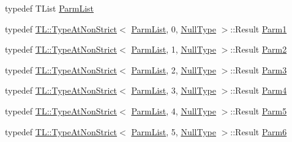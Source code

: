 \begin{DoxyCompactItemize}
\item 
typedef T\+List \mbox{\hyperlink{classUtil_1_1FunctionMap_a6cf0e6766cf6f20642ba61c4994bb477}{Parm\+List}}
\item 
typedef \mbox{\hyperlink{structUtil_1_1TL_1_1TypeAtNonStrict}{T\+L\+::\+Type\+At\+Non\+Strict}}$<$ \mbox{\hyperlink{classUtil_1_1FunctionMap_a6cf0e6766cf6f20642ba61c4994bb477}{Parm\+List}}, 0, \mbox{\hyperlink{classUtil_1_1NullType}{Null\+Type}} $>$\+::Result \mbox{\hyperlink{classUtil_1_1FunctionMap_a7b842c0101fae8075e8b21c90ede63cb}{Parm1}}
\item 
typedef \mbox{\hyperlink{structUtil_1_1TL_1_1TypeAtNonStrict}{T\+L\+::\+Type\+At\+Non\+Strict}}$<$ \mbox{\hyperlink{classUtil_1_1FunctionMap_a6cf0e6766cf6f20642ba61c4994bb477}{Parm\+List}}, 1, \mbox{\hyperlink{classUtil_1_1NullType}{Null\+Type}} $>$\+::Result \mbox{\hyperlink{classUtil_1_1FunctionMap_a46a76423783c6a8dcc4442ffb8cf54a4}{Parm2}}
\item 
typedef \mbox{\hyperlink{structUtil_1_1TL_1_1TypeAtNonStrict}{T\+L\+::\+Type\+At\+Non\+Strict}}$<$ \mbox{\hyperlink{classUtil_1_1FunctionMap_a6cf0e6766cf6f20642ba61c4994bb477}{Parm\+List}}, 2, \mbox{\hyperlink{classUtil_1_1NullType}{Null\+Type}} $>$\+::Result \mbox{\hyperlink{classUtil_1_1FunctionMap_a4578d42cd0723beba85654aa774d0145}{Parm3}}
\item 
typedef \mbox{\hyperlink{structUtil_1_1TL_1_1TypeAtNonStrict}{T\+L\+::\+Type\+At\+Non\+Strict}}$<$ \mbox{\hyperlink{classUtil_1_1FunctionMap_a6cf0e6766cf6f20642ba61c4994bb477}{Parm\+List}}, 3, \mbox{\hyperlink{classUtil_1_1NullType}{Null\+Type}} $>$\+::Result \mbox{\hyperlink{classUtil_1_1FunctionMap_a912703c1f39a6e219b2449183e48fb07}{Parm4}}
\item 
typedef \mbox{\hyperlink{structUtil_1_1TL_1_1TypeAtNonStrict}{T\+L\+::\+Type\+At\+Non\+Strict}}$<$ \mbox{\hyperlink{classUtil_1_1FunctionMap_a6cf0e6766cf6f20642ba61c4994bb477}{Parm\+List}}, 4, \mbox{\hyperlink{classUtil_1_1NullType}{Null\+Type}} $>$\+::Result \mbox{\hyperlink{classUtil_1_1FunctionMap_a993589d5b721f73c7905377e24dbf9f4}{Parm5}}
\item 
typedef \mbox{\hyperlink{structUtil_1_1TL_1_1TypeAtNonStrict}{T\+L\+::\+Type\+At\+Non\+Strict}}$<$ \mbox{\hyperlink{classUtil_1_1FunctionMap_a6cf0e6766cf6f20642ba61c4994bb477}{Parm\+List}}, 5, \mbox{\hyperlink{classUtil_1_1NullType}{Null\+Type}} $>$\+::Result \mbox{\hyperlink{classUtil_1_1FunctionMap_ae121f4a5c3534a888db59d6702a15b40}{Parm6}}
\end{DoxyCompactItemize}
